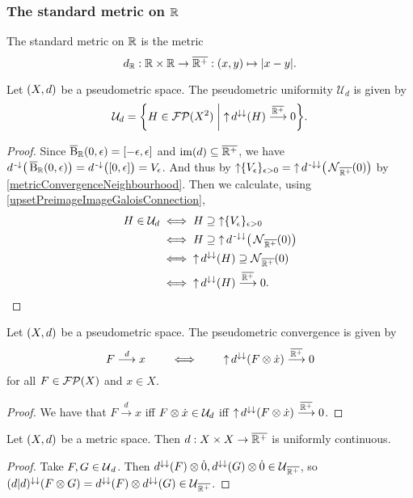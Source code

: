 \subsubsection{The standard metric on $\mathbb{R}$}
\begin{definition}
The standard metric on $\mathbb{R}$ is the metric
\[ d_{\mathbb{R}}: \mathbb{R}\times \mathbb{R}\to\overline{\mathbb{R}^+}: (x,y) \mapsto |x-y|. \]
\end{definition}

\begin{proposition} \label{imagePseudometricConvergesToZero}
Let $\sSet{X,d}$ be a pseudometric space. The pseudometric uniformity $\mathcal{U}_d$ is given by
\[ \mathcal{U}_d = \setbuilder{H\in \powerfilters(X^2)}{\upset d^{\imf\imf}(H) \overset{\overline{\R^+}}{\longrightarrow} 0}.  \]
\end{proposition}
\begin{proof}
Since $\cball_\R(0,\epsilon) = \interval{-\epsilon, \epsilon}$ and $\operatorname{im}(d)\subseteq \overline{\mathbb{R}^+}$, we have $d^\preimf\big(\cball_\R(0,\epsilon)\big) = d^\preimf\big(\interval{0,\epsilon}\big) = V_\epsilon$. And thus by $\operatorname{\uparrow}\{V_\epsilon\}_{\epsilon > 0} = \operatorname{\uparrow} d^{{\text{\hspace{0.15em}-}\downarrow}\downarrow}\big(\operatorname{\mathcal{N}}_{\overline{\mathbb{R}^+}}(0)\big)$ by \ref{metricConvergenceNeighbourhood}. Then we calculate, using \ref{upsetPreimageImageGaloisConnection},
\begin{align*}
H \in \mathcal{U}_d &\iff H \supseteq \operatorname{\uparrow} \{V_\epsilon\}_{\epsilon > 0} \\
&\iff H \supseteq \operatorname{\uparrow} d^{{\text{\hspace{0.15em}-}\downarrow}\downarrow}\big(\operatorname{\mathcal{N}}_{\overline{\mathbb{R}^+}}(0)\big) \\
&\iff \operatorname{\uparrow} d^{\downarrow\downarrow}(H)\supseteq \operatorname{\mathcal{N}}_{\overline{\mathbb{R}^+}}(0) \\
&\iff \operatorname{\uparrow} d^{\downarrow\downarrow}(H)\overset{\overline{\mathbb{R}^+}}{\longrightarrow} 0.
\end{align*}
\end{proof}
\begin{corollary} \label{metricConvergenceInitial}
Let $\sSet{X,d}$ be a pseudometric space. The pseudometric convergence is given by
\[ F \overset{d}{\longrightarrow} x \qquad\iff\qquad \operatorname{\uparrow} d^{\downarrow\downarrow}(F\otimes \dot{x}) \overset{\overline{\mathbb{R}^+}}{\longrightarrow} 0 \]
for all $F\in \operatorname{\mathcal{FP}}(X)$ and $x\in X$.
\end{corollary}
\begin{proof}
We have that $F \overset{d}{\longrightarrow} x$ iff $F\otimes \dot{x}\in \mathcal{U}_d$ iff $\operatorname{\uparrow} d^{\downarrow\downarrow}(F\otimes \dot{x}) \overset{\overline{\mathbb{R}^+}}{\longrightarrow} 0$.
\end{proof}
\begin{corollary} \label{metricUniformlyContinuous}
Let $\sSet{X,d}$ be a metric space. Then $d: X\times X\to \overline{\mathbb{R}^+}$ is uniformly continuous.
\end{corollary}
\begin{proof}
Take $F,G\in \operatorname{\mathcal{U}}_d$. Then $d^{\downarrow\downarrow}(F)\otimes \dot{0}, d^{\downarrow\downarrow}(G)\otimes \dot{0}\in \operatorname{\mathcal{U}}_{\overline{\mathbb{R}^+}}$, so $(d|d)^{\downarrow\downarrow}(F\otimes G) = d^{\downarrow\downarrow}(F)\otimes d^{\downarrow\downarrow}(G)\in \operatorname{\mathcal{U}}_{\overline{\mathbb{R}^+}}$.
\end{proof}

